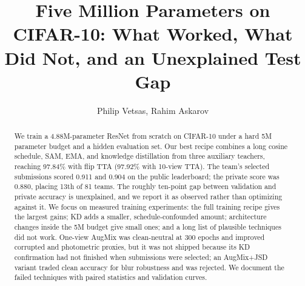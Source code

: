 \documentclass[letterpaper]{article}
\title{Five Million Parameters on CIFAR-10: What Worked, What Did Not, and an Unexplained Test Gap}
\author{
  Philip Vetsas,
  Rahim Askarov
}
\begin{document}
\maketitle

\begin{abstract}
We train a 4.88M-parameter ResNet from scratch on CIFAR-10 under a hard 5M
parameter budget and a hidden evaluation set. Our best recipe combines a long
cosine schedule, SAM, EMA, and knowledge distillation from three auxiliary
teachers, reaching 97.84\% with flip TTA (97.92\% with 10-view TTA).
The team's selected submissions scored 0.911 and 0.904 on the public leaderboard;
the private score was 0.880, placing 13th of 81 teams. The roughly ten-point gap between
validation and private accuracy is unexplained, and we report it as observed
rather than optimizing against it. We focus on measured training experiments:
the full training recipe gives the largest gains; KD adds a
smaller, schedule-confounded amount; architecture changes inside the 5M budget
give small ones; and a long list of plausible techniques did not work.
One-view AugMix was clean-neutral at 300 epochs and improved corrupted and
photometric proxies, but it was not shipped because its KD confirmation had not
finished when submissions were selected; an AugMix+JSD variant traded clean accuracy for blur
robustness and was rejected. We document the failed techniques with paired
statistics and validation curves.
\end{abstract}









\end{document}
